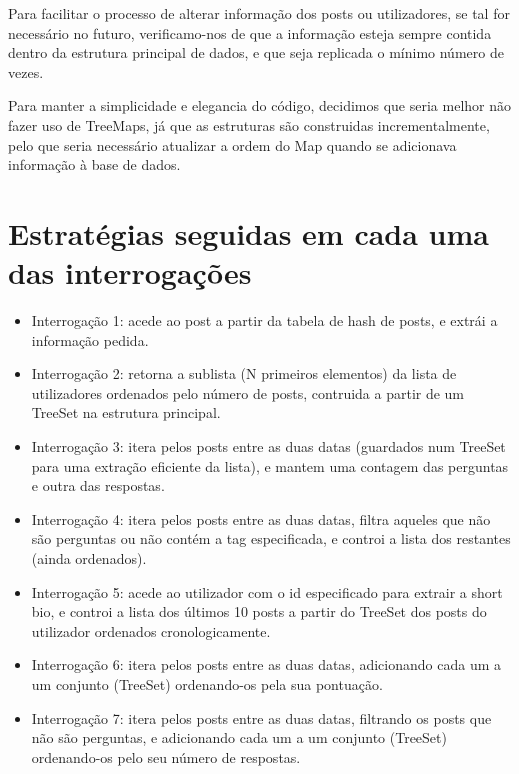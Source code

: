 \documentclass[10pt]{report}
\newcommand\tab[1][0.5cm]{\hspace*{#1}}
\begin{document}
\tab Para facilitar o processo de alterar informação dos posts ou utilizadores, se tal for necessário no futuro, verificamo-nos de que a informação esteja sempre contida dentro da estrutura principal de dados, e que seja replicada o mínimo número de vezes.

Para manter a simplicidade e elegancia do código, decidimos que seria melhor não fazer uso de TreeMaps, já que as estruturas são construidas incrementalmente, pelo que seria necessário atualizar a ordem do Map quando se adicionava informação à base de dados.

\section{Estratégias seguidas em cada uma das interrogações}

\begin{itemize}

\item Interrogação 1: acede ao post a partir da tabela de hash de posts, e extrái a informação pedida.

\item Interrogação 2: retorna a sublista (N primeiros elementos) da lista de utilizadores ordenados pelo número de posts, contruida a partir de um TreeSet na estrutura principal.

\item Interrogação 3: itera pelos posts entre as duas datas (guardados num TreeSet para uma extração eficiente da lista), e mantem uma contagem das perguntas e outra das respostas.

\item Interrogação 4: itera pelos posts entre as duas datas, filtra aqueles que não são perguntas ou não contém a tag especificada, e controi a lista dos restantes (ainda ordenados).

\item Interrogação 5: acede ao utilizador com o id especificado para extrair a short bio, e controi a lista dos últimos 10 posts a partir do TreeSet dos posts do utilizador ordenados cronologicamente.

\item Interrogação 6: itera pelos posts entre as duas datas, adicionando cada um a um conjunto (TreeSet) ordenando-os pela sua pontuação.

\item Interrogação 7: itera pelos posts entre as duas datas, filtrando os posts que não são perguntas, e adicionando cada um a um conjunto (TreeSet) ordenando-os pelo seu número de respostas.


\end{itemize}
\end{document}
